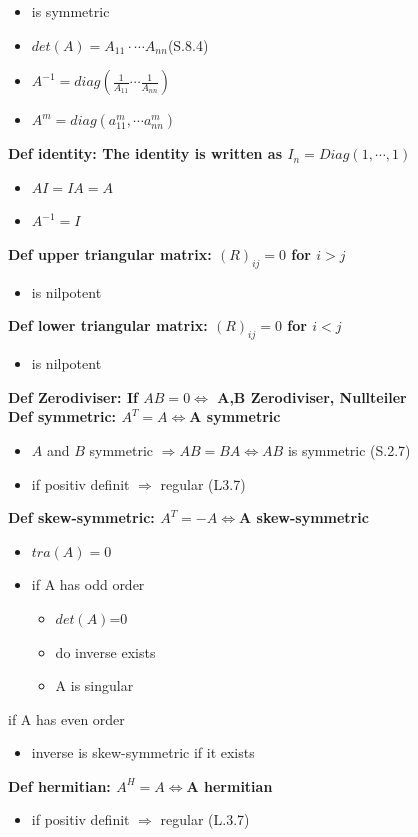 \documentclass[7pt,landscape, margin = 0.1mm]{article}
\newcommand{\DEF}[2]{\color{chaptercolor}\bf{Def #1}:\color{black}    \hspace{0.2cm} #2 \\}
\begin{document}
\begin{multicols}{4}
\begin{flushleft}
\begin{itemize}
\item is symmetric
\item $det(A) = A_{11} \cdot \cdots A_{nn} $(S.8.4)
\item $A^{-1} = diag(\frac{1}{A_{11}} \cdots \frac{1}{A_{nn}})$
\item $A^m = diag(a_{11}^{m}, \cdots a_{nn}^{m} ) $
\end{itemize}
\DEF{identity}{The identity is written as $I_n = Diag(1 , \cdots , 1)$ }
\begin{itemize}
\item $AI = IA = A $
\item $A^{-1} = I $
\end{itemize}
\DEF{upper triangular matrix}{$(R)_{ij} = 0$ for $i > j $ }
\begin{itemize}
\item is nilpotent
\end{itemize}
\DEF{lower triangular matrix}{$(R)_{ij} = 0$ for $i < j $ }
\begin{itemize}
\item is nilpotent
\end{itemize}
\DEF{Zerodiviser}{If $AB=0  \Leftrightarrow $ A,B Zerodiviser, Nullteiler}
\DEF{symmetric}{$A^T = A  \Leftrightarrow $A symmetric}
\begin{itemize}
\item $ A$ and $B $ symmetric $\Rightarrow AB=BA \Leftrightarrow AB$ is symmetric   (S.2.7)
\item if positiv definit $\Rightarrow $ regular (L3.7)
\end{itemize}
\DEF{skew-symmetric}{$A^T = -A  \Leftrightarrow $A skew-symmetric}
\begin{itemize}
\item $tra(A)=0 $
\item if A has odd order
\begin{itemize}
\item $det(A)$=0
\item do inverse exists
\item A is singular
\end{itemize}  
\end{itemize}
\item if A has even order
\begin{itemize}
\item inverse is skew-symmetric if it exists
\end{itemize}
\DEF{hermitian}{$A^H = A  \Leftrightarrow $A hermitian}
\begin{itemize}
\item if positiv definit $\Rightarrow $ regular (L.3.7)
\end{itemize}


\end{flushleft}
\end{multicols}
\end{document}
